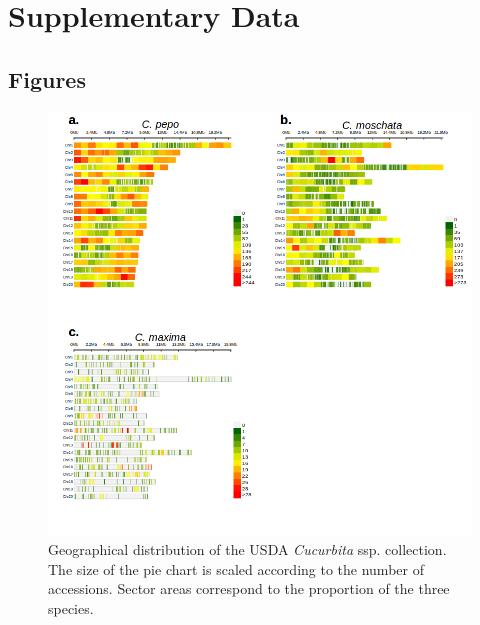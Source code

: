 \documentclass[utf8]{frontiers_suppmat} %
\begin{document}
\onecolumn
{}

\title {{}}


\maketitle


\section{Supplementary Data}


\subsection{Figures}


\begin{figure}[h]
	\begin{center}
		\includegraphics[width=\textwidth]{../supplemental/02_fig.png}
	\end{center}
	\caption{Geographical distribution of the USDA \textit{Cucurbita} ssp. collection. The size of the pie chart is scaled according to the number of accessions. Sector areas correspond to the proportion of the three species. \label{fig:1}}
\end{figure}
\end{document}
